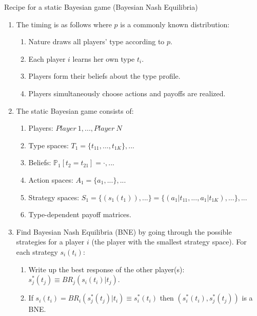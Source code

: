 \begin{frame}{Recipe for a static Bayesian game (Bayesian Nash Equilibria)}
    \begin{enumerate}
      \item The timing is as follows where $p$ is a commonly known distribution:
      \begin{enumerate}\normalsize
        \item Nature draws all players' type according to $p$.
        \item Each player $i$ learns her own type $t_{i}$.
        \item Players form their beliefs about the type profile.
        \item Players simultaneously choose actions and payoffs are realized.
      \end{enumerate}
      \item The static Bayesian game consists of:
      \begin{enumerate}\normalsize
        \item Players: $Player\ 1,...,Player\ N$
        \item Type spaces: $T_1=\{t_{11},...,t_{1K}\},...$
        \item Beliefs: $\mathbb{P}_1[t_2=t_{21}]=\cdot,...$
        \item Action spaces: $A_1=\{a_1,...\},...$
        \item Strategy spaces: $S_1=\{(s_1(t_1)),...\}=\{(a_1|t_{11},...,a_1|t_{1K}),...\},...$
        \item Type-dependent payoff matrices.
      \end{enumerate}
      \item Find Bayesian Nash Equilibria (BNE) by going through the possible strategies for a player $i$ (the player with the smallest strategy space). For each strategy $s_i(t_i)$:
      \begin{enumerate}\normalsize
        \item Write up the best response of the other player(s): $s_j^*(t_j)\equiv BR_j\left(s_i(t_i)|t_j\right)$.
        \item If $s_i(t_i)=BR_i\left(s_j^*(t_j)|t_i\right)\equiv s_i^*(t_i)$ then $\left(s_i^*(t_i),s_j^*(t_j)\right)$ is a BNE.
      \end{enumerate}
    \end{enumerate}
    \vfill\null
\end{frame}
